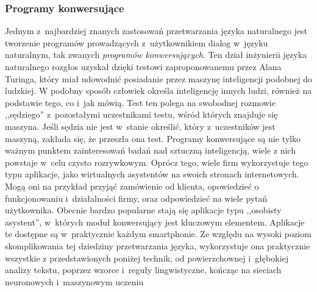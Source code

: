 \documentclass[a4paper, twoside, 12pt]{report}
\begin{document}
            \subsubsection{Programy konwersujące}
                Jednym z~najbardziej znanych zastosowań przetwarzania języka naturalnego jest tworzenie programów
                prowadzących z~użytkownikiem dialog w~języku naturalnym, tak zwanych \emph{programów konwersujących}.
                Ten dział inżynierii języka naturalnego rozgłos uzyskał dzięki testowi zaproponowanemu przez Alana Turinga,
                który miał udowodnić posiadanie przez maszynę inteligencji podobnej do ludzkiej. W podobny sposób człowiek
                określa inteligencję innych ludzi, również na podstawie tego, co i~jak mówią. Test ten polega na swobodnej
                rozmowie ,,sędziego'' z~pozostałymi uczestnikami testu, wśród których znajduje się maszyna. Jeśli sędzia
                nie jest w~stanie określić, który z~uczestników jest maszyną, zakłada się, że przeszła ona test.
                Programy konwersujące są nie tylko ważnym punktem zainteresowań badań nad sztuczną inteligencją, wiele z
                nich powstaje w~celu czysto rozrywkowym. Oprócz tego, wiele firm wykorzystuje tego typu aplikacje,
                jako wirtualnych asystentów na swoich stronach internetowych. Mogą oni na przykład przyjąć zamówienie od
                klienta, opowiedzieć o funkcjonowaniu i~działalności firmy, oraz odpowiedzieć na wiele pytań użytkownika.
                Obecnie bardzo popularne stają się aplikacje typu ,,osobisty asystent'', w~których moduł konwersujący jest
                kluczowym elementem. Aplikacje te dostępne są w~praktycznie każdym smartphonie. Ze względu na wysoki
                poziom skomplikowania tej dziedziny przetwarzania języka, wykorzystuje ona praktycznie wszystkie z
                przedstawionych poniżej technik, od powierzchownej i~głębokiej analizy tekstu, poprzez wzorce i~reguły
                lingwistyczne, kończąc na sieciach neuronowych i~maszynowym uczeniu
\end{document}
